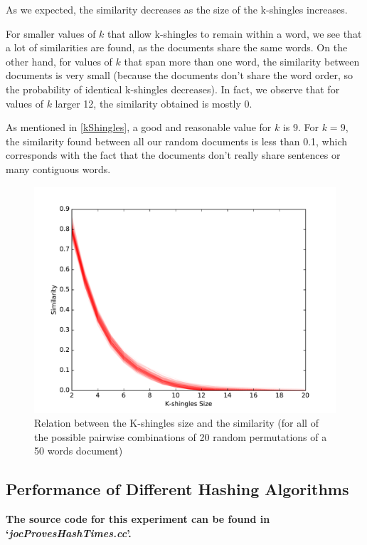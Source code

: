 \documentclass[12pt]{article}
\begin{document}
\bigbreak
As we expected, the similarity decreases as the size of the k-shingles increases.

For smaller values of $k$ that allow k-shingles to remain within a word, we see that a lot of similarities are found, as the documents share the same words.
On the other hand, for values of $k$ that span more than one word, the similarity between documents is very small (because the documents don't share the word order, so the probability of identical k-shingles decreases).
In fact, we observe that for values of $k$ larger 12, the similarity obtained is mostly 0.

As mentioned in \autoref{kShingles}, a good and reasonable value for $k$ is 9.
For $k = 9$, the similarity found between all our random documents is less than 0.1, which corresponds with the fact that the documents don't really share sentences or many contiguous words.

\begin{figure}[H]
	\centering
	\includegraphics[scale=0.5]{graphs/JaccardSimilarityValueKshingles.pdf} 
	\caption{Relation between the K-shingles size and the similarity (for all of the possible pairwise combinations of 20 random permutations of a 50 words document)}
	\label{fig:KShinglesSimilarity}
\end{figure}

\subsection{Performance of Different Hashing Algorithms}
\textbf{The source code for this experiment can be found in `\textit{jocProvesHashTimes.cc}'.}
\bigskip
\end{document}
